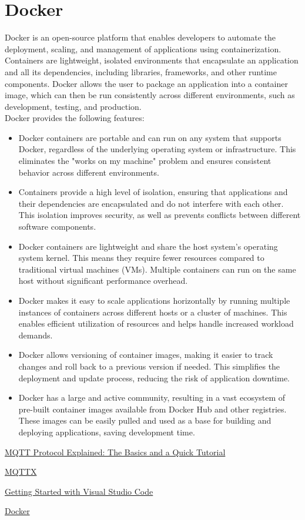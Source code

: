 \section{Docker}
Docker is an open-source platform that enables developers to automate the deployment, scaling, and management of applications using containerization. Containers are lightweight, isolated environments that encapsulate an application and all its dependencies, including libraries, frameworks, and other runtime components. Docker allows the user to package an application into a container image, which can then be run consistently across different environments, such as development, testing, and production.\vspace{5mm} \\
Docker provides the following features:
\begin{itemize}
  \item Docker containers are portable and can run on any system that supports Docker, regardless of the underlying operating system or infrastructure. This eliminates the "works on my machine" problem and ensures consistent behavior across different environments.
  \item Containers provide a high level of isolation, ensuring that applications and their dependencies are encapsulated and do not interfere with each other. This isolation improves security, as well as prevents conflicts between different software components.
  \item Docker containers are lightweight and share the host system's operating system kernel. This means they require fewer resources compared to traditional virtual machines (VMs). Multiple containers can run on the same host without significant performance overhead.
  \item Docker makes it easy to scale applications horizontally by running multiple instances of containers across different hosts or a cluster of machines. This enables efficient utilization of resources and helps handle increased workload demands.
  \item Docker allows versioning of container images, making it easier to track changes and roll back to a previous version if needed. This simplifies the deployment and update process, reducing the risk of application downtime.
  \item Docker has a large and active community, resulting in a vast ecosystem of pre-built container images available from Docker Hub and other registries. These images can be easily pulled and used as a base for building and deploying applications, saving development time.
\end{itemize}

 \href{https://www.emqx.com/en/blog/the-easiest-guide-to-getting-started-with-mqtt}{MQTT Protocol Explained: The Basics and a Quick Tutorial}

\href{https://mqttx.app/?utm_source=mqttx&utm_medium=referral&utm_campaign=logo-to-homepage}{MQTTX}

 \href{https://code.visualstudio.com/docs}{Getting Started with Visual Studio Code}

 \href{https://www.docker.com/}{Docker}


